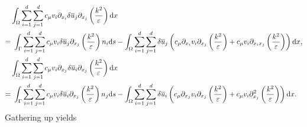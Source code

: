 \documentclass[oneside,11pt]{book}
\numberwithin{equation}{section}
\begin{document}
\begin{align*}
    &\int_\Omega \sum_{i=1}^d\sum_{j=1}^d c_\mu v_i\partial_{x_i}\delta\overline{u}_j\partial_{x_j}\left(\frac{k^2}{\varepsilon}\right){\rm d}x\\
    =&\ \int_\Gamma \sum_{i=1}^d\sum_{j=1}^d c_\mu v_i\delta\overline{u}_j\partial_{x_j}\left(\frac{k^2}{\varepsilon}\right)n_i{\rm d}s - \int_\Omega \sum_{i=1}^d\sum_{j=1}^d \delta\overline{u}_j\left(c_\mu\partial_{x_i}v_i\partial_{x_j}\left(\frac{k^2}{\varepsilon}\right) + c_\mu v_i\partial_{x_ix_j}\left(\frac{k^2}{\varepsilon}\right)\right){\rm d}x,\\
    &\int_\Omega \sum_{i=1}^d\sum_{j=1}^d c_\mu v_i\partial_{x_j}\delta\overline{u}_i\partial_{x_j}\left(\frac{k^2}{\varepsilon}\right){\rm d}x\\
    =&\ \int_\Gamma \sum_{i=1}^d\sum_{j=1}^d c_\mu v_i\delta\overline{u}_i\partial_{x_j}\left(\frac{k^2}{\varepsilon}\right)n_j{\rm d}s - \int_\Omega \sum_{i=1}^d\sum_{j=1}^d \delta\overline{u}_i\left(c_\mu\partial_{x_j}v_i\partial_{x_j}\left(\frac{k^2}{\varepsilon}\right) + c_\mu v_i\partial_{x_j}^2\left(\frac{k^2}{\varepsilon}\right)\right){\rm d}x.
\end{align*}
Gathering up yields
\end{document}
